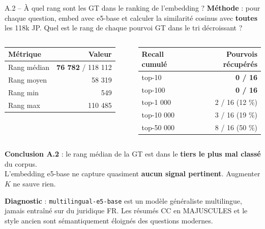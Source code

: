 \documentclass[aspectratio=169,10pt]{beamer}
\newcommand{\warnbox}[1]{%
  \begin{center}
  \colorbox{red!10}{\parbox{0.92\linewidth}{\centering #1}}
  \end{center}}
\begin{document}
\begin{frame}{A.2 -- À quel rang sont les GT dans le ranking de l'embedding ?}
  \footnotesize
  \textbf{Méthode} : pour chaque question, embed avec e5-base et calculer la similarité cosinus avec \textbf{toutes} les 118k JP. Quel est le rang de chaque pourvoi GT dans le tri décroissant ?

  \vspace{0.4em}
  \begin{columns}[T]
    \footnotesize
    \begin{tabular}{@{}l r@{}}
      \toprule
      \textbf{Métrique} & \textbf{Valeur} \\
      \midrule
      Rang médian & \textbf{76 782} / 118 112 \\
      Rang moyen  & 58 319 \\
      Rang min    & 549 \\
      Rang max    & 110 485 \\
      \bottomrule
    \end{tabular}

    \footnotesize
    \begin{tabular}{@{}l r@{}}
      \toprule
      \textbf{Recall cumulé} & \textbf{Pourvois récupérés} \\
      \midrule
      top-10     & \textbf{0 / 16} \\
      top-100    & \textbf{0 / 16} \\
      top-1 000  & 2 / 16 (12 \%) \\
      top-10 000 & 3 / 16 (19 \%) \\
      top-50 000 & 8 / 16 (50 \%) \\
      \bottomrule
    \end{tabular}
  \end{columns}

  \vspace{0.6em}
  \warnbox{\textbf{Conclusion A.2} : le rang médian de la GT est dans le \textbf{tiers le plus mal classé} du corpus.\\
  L'embedding e5-base ne capture quasiment \textbf{aucun signal pertinent}. Augmenter $K$ ne sauve rien.}

  \vspace{0.4em}
  \textbf{Diagnostic} : \texttt{multilingual-e5-base} est un modèle généraliste multilingue, jamais entraîné sur du juridique FR. Les résumés CC en MAJUSCULES et le style ancien sont sémantiquement éloignés des questions modernes.
\end{frame}
\end{document}
